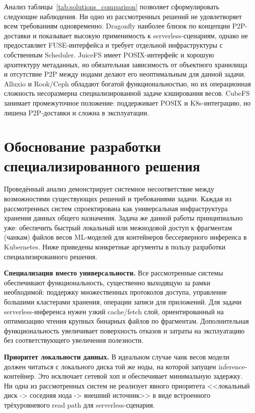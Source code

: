 Анализ таблицы~\ref{tab:solutions_comparison} позволяет сформулировать следующие наблюдения. Ни одно из рассмотренных решений не удовлетворяет всем требованиям одновременно. Dragonfly наиболее близок по концепции P2P-доставки и показывает высокую применимость к serverless-сценариям, однако не предоставляет FUSE-интерфейса и требует отдельной инфраструктуры с собственным Scheduler. JuiceFS имеет POSIX-интерфейс и хорошую архитектуру метаданных, но обязательная зависимость от объектного хранилища и отсутствие P2P между нодами делают его неоптимальным для данной задачи. Alluxio и Rook/Ceph обладают богатой функциональностью, но их операционная сложность несоразмерна специализированной задаче кэширования весов. CubeFS занимает промежуточное положение: поддерживает POSIX и K8s-интеграцию, но лишена P2P-доставки и сложна в эксплуатации.

\section{Обоснование разработки специализированного решения}
\label{sec:justification}

Проведённый анализ демонстрирует системное несоответствие между возможностями существующих решений и требованиями задачи. Каждая из рассмотренных систем спроектирована как универсальная инфраструктура хранения данных общего назначения. Задача же данной работы принципиально уже: обеспечить быстрый локальный или межнодовой доступ к фрагментам (чанкам) файлов весов ML-моделей для контейнеров бессерверного инференса в Kubernetes. Ниже приведены конкретные аргументы в пользу разработки специализированного решения.

\textbf{Специализация вместо универсальности.} Все рассмотренные системы обеспечивают функциональность, существенно выходящую за рамки необходимой: поддержку множественных протоколов доступа, управление большими кластерами хранения, операции записи для приложений. Для задачи serverless-инференса нужен узкий cache/fetch слой, ориентированный на оптимизацию чтения крупных бинарных файлов по фрагментам. Дополнительная функциональность увеличивает поверхность отказов и затраты на эксплуатацию без соответствующего увеличения полезности.

\textbf{Приоритет локальности данных.} В идеальном случае чанк весов модели должен читаться с локального диска той же ноды, на которой запущен inference-контейнер. Это исключает сетевой хоп и обеспечивает минимальную задержку. Ни одна из рассмотренных систем не реализует явного приоритета <<локальный диск -> соседняя нода -> внешний источник>> в виде встроенного трёхуровневого read path для serverless-сценария.

